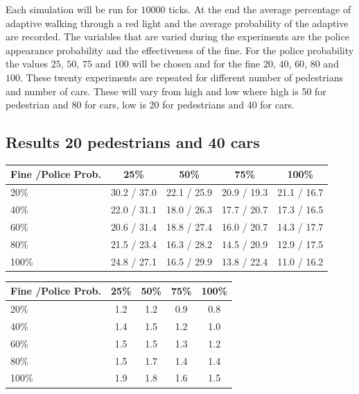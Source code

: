 \documentclass[a4paper]{article}
\begin{document}
Each simulation will be run for $10000$ ticks. At the end the average percentage of adaptive walking through a red light and the average probability of the adaptive are recorded. The variables that are varied during the experiments are the police appearance probability and the effectiveness of the fine. For the police probability the values $25$, $50$, $75$ and $100$ will be chosen and for the fine $20$, $40$, $60$, $80$ and $100$. These twenty experiments are repeated for different number of pedestrians and number of cars. These will vary from high and low where high is 50 for pedestrian and 80 for cars, low is 20 for pedestrians and 40 for cars.

\clearpage
\subsection{Results 20 pedestrians and 40 cars}
\begin{table}[H]
\centering
\begin{tabular}{ l | c c c c }
  Fine \slash Police Prob. & 25\% & 50\% & 75\% & 100\% \\ 
  \hline
  20\%  & 30.2 / 37.0 & 22.1 / 25.9 & 20.9 / 19.3 & 21.1 / 16.7  \\
  40\%  & 22.0 / 31.1 & 18.0 / 26.3 & 17.7 / 20.7 & 17.3 / 16.5  \\
  60\%  & 20.6 / 31.4 & 18.8 / 27.4 & 16.0 / 20.7 & 14.3 / 17.7  \\
  80\%  & 21.5 / 23.4 & 16.3 / 28.2 & 14.5 / 20.9 & 12.9 / 17.5  \\
  100\% & 24.8 / 27.1 & 16.5 / 29.9 & 13.8 / 22.4 & 11.0 / 16.2  \\
\end{tabular}
\end{table}

\begin{table}[H]
\centering
\begin{tabular}{ l | c c c c }
  Fine \slash Police Prob. & 25\% & 50\% & 75\% & 100\% \\ 
  \hline
  20\%  & 1.2 & 1.2 & 0.9 & 0.8  \\
  40\%  & 1.4 & 1.5 & 1.2 & 1.0  \\
  60\%  & 1.5 & 1.5 & 1.3 & 1.2  \\
  80\%  & 1.5 & 1.7 & 1.4 & 1.4  \\
  100\% & 1.9 & 1.8 & 1.6 & 1.5  \\
\end{tabular}
\end{table}
\end{document}
